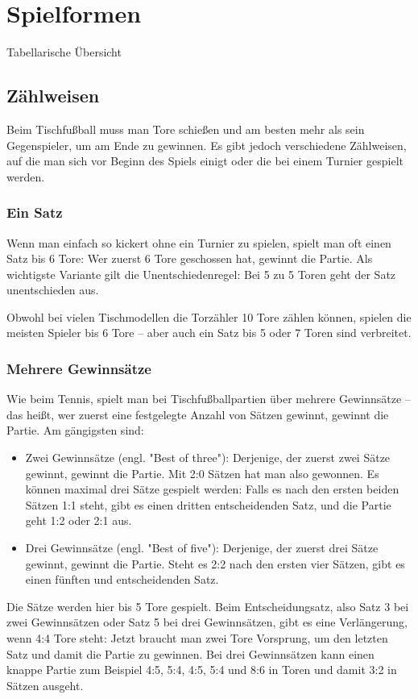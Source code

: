 \chapter{Spielformen}
\label{spielformen}

Tabellarische Übersicht


\section{Zählweisen}
\label{spielformen:zaehlweisen}

Beim Tischfußball muss man Tore schießen und am besten mehr als sein Gegenspieler, um am Ende zu gewinnen.
Es gibt jedoch verschiedene Zählweisen, auf die man sich vor Beginn des Spiels einigt oder die bei einem Turnier gespielt werden. 
\subsection{Ein Satz}
\label{spielformen:zaehlweisen:einsatz}

Wenn man einfach so kickert ohne ein Turnier zu spielen, spielt man oft einen Satz bis 6 Tore: Wer zuerst 6 Tore geschossen hat, gewinnt die Partie.
Als wichtigste Variante gilt die Unentschiedenregel: Bei 5 zu 5 Toren geht der Satz unentschieden aus.

Obwohl bei vielen Tischmodellen die Torzähler 10 Tore zählen können, spielen die meisten Spieler bis 6 Tore -- aber auch ein Satz bis 5 oder 7 Toren sind verbreitet.

\subsection{Mehrere Gewinnsätze}
\label{spielformen:zaehlweisen:gewinnsaetze}

Wie beim Tennis, spielt man bei Tischfußballpartien über mehrere Gewinnsätze -- das heißt, wer zuerst eine festgelegte Anzahl von Sätzen gewinnt, gewinnt die Partie. Am gängigsten sind:
\begin{itemize}
\item Zwei Gewinnsätze (engl. "Best of three"): Derjenige, der zuerst zwei Sätze gewinnt, gewinnt die Partie. Mit 2:0 Sätzen hat man also gewonnen. 
Es können maximal drei Sätze gespielt werden: Falls es nach den ersten beiden Sätzen 1:1 steht, gibt es einen dritten entscheidenden Satz, und die Partie geht 1:2 oder 2:1 aus. 
\item Drei Gewinnsätze (engl. "Best of five"): Derjenige, der zuerst drei Sätze gewinnt, gewinnt die Partie. Steht es 2:2 nach den ersten vier Sätzen, gibt es einen fünften und entscheidenden Satz. 
\end{itemize}
Die Sätze werden hier bis 5 Tore gespielt. Beim Entscheidungsatz, also Satz 3 bei zwei Gewinnsätzen oder Satz 5 bei drei Gewinnsätzen, gibt es eine Verlängerung, wenn 4:4 Tore steht: Jetzt braucht man zwei Tore Vorsprung, um den letzten Satz und damit die Partie zu gewinnen. Bei drei Gewinnsätzen kann einen knappe Partie zum Beispiel 4:5, 5:4, 4:5, 5:4 und 8:6 in Toren und damit 3:2 in Sätzen ausgeht. 

